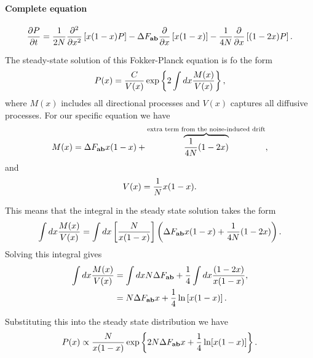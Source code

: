 \paragraph{Complete equation}
\begin{equation}
  {\partial P \over \partial t} = {1 \over 2N}
  {\partial^2 \over \partial x^2} \left[ x (1 - x) P \right] -
  \Delta F_{\mathbf{ab}} {\partial \over \partial x} \left[ x (1 - x)  \right] -
  {1 \over 4N} {\partial \over \partial x} \left[ (1 - 2x) P \right].
\end{equation}

The steady-state solution of this Fokker-Planck equation is fo the form
\begin{equation}
  P(x) = {C \over V(x)} \exp \left\{ 2 \int dx {M(x) \over V(x)} \right\},
\end{equation}
where $M(x)$ includes all directional processes and $V(x)$ captures all
diffusive processes. For our specific equation we have
\begin{equation}
  M(x) = \Delta F_{\mathbf{ab}} x (1 - x) + \overbrace{{1 \over 4N} (1 - 2x)}^
  {\text{extra term from the noise-induced drift}},
\end{equation}
and
\begin{equation}
  V(x) = {1 \over N} x (1 - x).
\end{equation}

This means that the integral in the steady state solution takes the form
\begin{equation}
  \int dx {M(x) \over V(x)} = \int dx \left[ {N \over x (1 - x)} \right]
  \left( \Delta F_{\mathbf{ab}} x (1 - x) + {1 \over 4N} (1 - 2x) \right).
\end{equation}
Solving this integral gives
\begin{align}
  \int dx {M(x) \over V(x)} &= \int dx N \Delta F_{\mathbf{ab}} +
  {1 \over 4} \int dx {(1 - 2x) \over x (1 - x)}, \\
  &= N \Delta F_{\mathbf{ab}} x + {1 \over 4} \ln \left[ x ( 1 - x) \right].
\end{align}

Substituting this into the steady state distribution we have
\begin{equation}
  P(x) \propto {N \over x (1 - x)} \exp \left\{ 2N \Delta F_{\mathbf{ab}} x +
  {1 \over 4} \ln[x (1 - x)] \right\}.
\end{equation}


